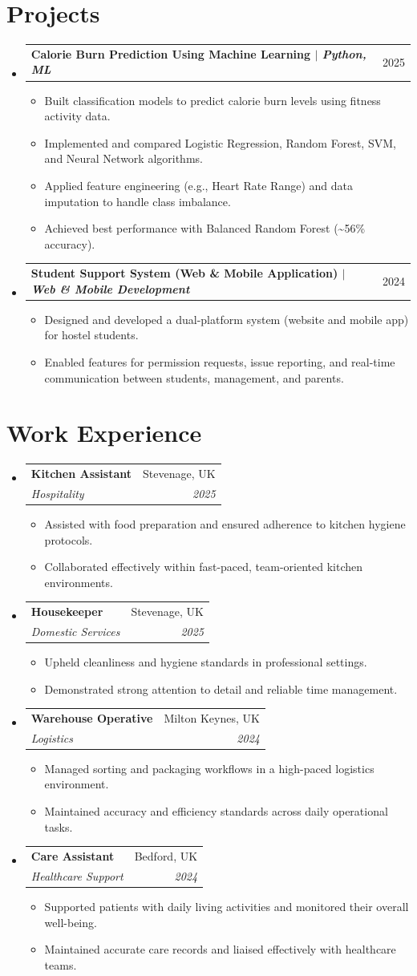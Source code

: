\documentclass[a4paper,11pt]{article}
\makeatletter
\newcommand{\resumeItem}[1]{
  \item\small{#1}
}
\newcommand{\resumeSubheading}[4]{
  \item
    \begin{tabular*}{0.97\textwidth}[t]{l@{\extracolsep{\fill}}r}
      \textbf{#1} & #2 \\
      \textit{\small#3} & \textit{\small #4} \\
    \end{tabular*}\vspace{-5pt}
}
\newcommand{\resumeProjectHeading}[2]{
  \item
    \begin{tabular*}{0.97\textwidth}{l@{\extracolsep{\fill}}r}
      \small\textbf{#1} & \small #2 \\
    \end{tabular*}\vspace{-5pt}
}
\newcommand{\resumeSubHeadingListStart}{\begin{itemize}[leftmargin=0.15in, label={}]}
\newcommand{\resumeSubHeadingListEnd}{\end{itemize}}
\newcommand{\resumeItemListStart}{\begin{itemize}[leftmargin=0.25in, itemsep=2pt, parsep=0pt, topsep=0pt]}
\newcommand{\resumeItemListEnd}{\end{itemize}\vspace{-5pt}}
\makeatother
\begin{document}
\section{Projects}
\resumeSubHeadingListStart
  \resumeProjectHeading
    {Calorie Burn Prediction Using Machine Learning $|$ \emph{Python, ML}}{2025}
    \resumeItemListStart
      \resumeItem{Built classification models to predict calorie burn levels using fitness activity data.}
      \resumeItem{Implemented and compared Logistic Regression, Random Forest, SVM, and Neural Network algorithms.}
      \resumeItem{Applied feature engineering (e.g., Heart Rate Range) and data imputation to handle class imbalance.}
      \resumeItem{Achieved best performance with Balanced Random Forest (\textasciitilde56\% accuracy).}
    \resumeItemListEnd
  \resumeProjectHeading
    {Student Support System (Web \& Mobile Application) $|$ \emph{Web \& Mobile Development}}{2024}
    \resumeItemListStart
      \resumeItem{Designed and developed a dual-platform system (website and mobile app) for hostel students.}
      \resumeItem{Enabled features for permission requests, issue reporting, and real-time communication between students, management, and parents.}
    \resumeItemListEnd
\resumeSubHeadingListEnd

\section{Work Experience}
\resumeSubHeadingListStart
  \resumeSubheading
    {Kitchen Assistant}{Stevenage, UK}
    {Hospitality}{2025}
    \resumeItemListStart
      \resumeItem{Assisted with food preparation and ensured adherence to kitchen hygiene protocols.}
      \resumeItem{Collaborated effectively within fast-paced, team-oriented kitchen environments.}
    \resumeItemListEnd
  \resumeSubheading
    {Housekeeper}{Stevenage, UK}
    {Domestic Services}{2025}
    \resumeItemListStart
      \resumeItem{Upheld cleanliness and hygiene standards in professional settings.}
      \resumeItem{Demonstrated strong attention to detail and reliable time management.}
    \resumeItemListEnd
  \resumeSubheading
    {Warehouse Operative}{Milton Keynes, UK}
    {Logistics}{2024}
    \resumeItemListStart
      \resumeItem{Managed sorting and packaging workflows in a high-paced logistics environment.}
      \resumeItem{Maintained accuracy and efficiency standards across daily operational tasks.}
    \resumeItemListEnd
  \resumeSubheading
    {Care Assistant}{Bedford, UK}
    {Healthcare Support}{2024}
    \resumeItemListStart
      \resumeItem{Supported patients with daily living activities and monitored their overall well-being.}
      \resumeItem{Maintained accurate care records and liaised effectively with healthcare teams.}
    \resumeItemListEnd
\resumeSubHeadingListEnd
\end{document}
